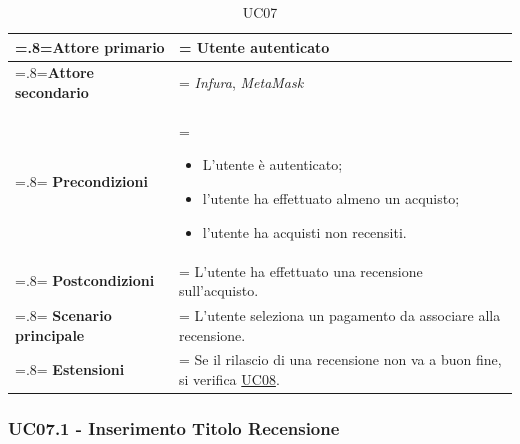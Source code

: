             \begin{table}[H]
                \centering
                \renewcommand{\arraystretch}{1.8}
                \renewcommand\tabularxcolumn[1]{m{#1}}
                \begin{tabularx}{0.9\textwidth}{
                    >{\hsize=.8\hsize\linewidth=\hsize}X
                    >{\hsize=1.2\hsize\linewidth=\hsize}X}
                    \hline
                    \textbf{Attore primario} & Utente autenticato \\
                    \hline
                    \textbf{Attore secondario} & \textit{Infura}, \textit{MetaMask} \\
                    \hline
                    \textbf{Precondizioni} &
                        \begin{itemize}
                            \item L'utente è autenticato;
                            \item l'utente ha effettuato almeno un acquisto;
                            \item l'utente ha acquisti non recensiti.
                        \end{itemize} \\
                    \hline
                    \textbf{Postcondizioni} & L'utente ha effettuato una recensione sull'acquisto. \\
                    \hline
                    \textbf{Scenario principale} &
                    L'utente seleziona un pagamento da associare alla recensione.\\
                    \hline
                    \textbf{Estensioni} & Se il rilascio di una recensione non va a buon fine, si verifica \hyperref[UC08]{UC08}. \\
                    \hline
                \end{tabularx}
                \caption{UC07}
            \end{table}

            \subsubsection{UC07.1 - Inserimento Titolo Recensione}
            \label{UC07.1}

